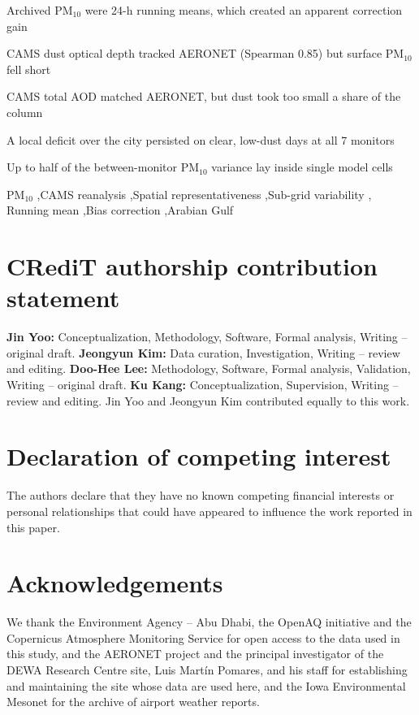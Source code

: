 \documentclass[preprint,review,12pt,authoryear]{elsarticle}
\begin{document}
\begin{frontmatter}
\begin{highlights}
\item Archived PM$_{10}$ were 24-h running means, which created an apparent correction gain
\item CAMS dust optical depth tracked AERONET (Spearman 0.85) but surface PM$_{10}$ fell short
\item CAMS total AOD matched AERONET, but dust took too small a share of the column
\item A local deficit over the city persisted on clear, low-dust days at all 7 monitors
\item Up to half of the between-monitor PM$_{10}$ variance lay inside single model cells
\end{highlights}

\begin{keyword}
PM$_{10}$ \sep CAMS reanalysis \sep Spatial representativeness \sep Sub-grid variability \sep
Running mean \sep Bias correction \sep Arabian Gulf
\end{keyword}

\end{frontmatter}

\linenumbers



\section*{CRediT authorship contribution statement}
\textbf{Jin Yoo:} Conceptualization, Methodology, Software, Formal analysis, Writing -- original
draft. \textbf{Jeongyun Kim:} Data curation, Investigation, Writing -- review and editing.
\textbf{Doo-Hee Lee:} Methodology, Software, Formal analysis, Validation, Writing -- original
draft. \textbf{Ku Kang:} Conceptualization, Supervision, Writing -- review
and editing. Jin Yoo and Jeongyun Kim contributed equally to this work.

\section*{Declaration of competing interest}
The authors declare that they have no known competing financial interests or personal
relationships that could have appeared to influence the work reported in this paper.

\section*{Acknowledgements}
We thank the Environment Agency -- Abu Dhabi, the OpenAQ initiative and the Copernicus Atmosphere
Monitoring Service for open access to the data used in this study, and the AERONET project and
the principal investigator of the DEWA Research Centre site, Luis Mart\'in Pomares, and his staff
for establishing and maintaining the site whose data are used here, and the Iowa Environmental
Mesonet for the archive of airport weather reports.
\end{document}
